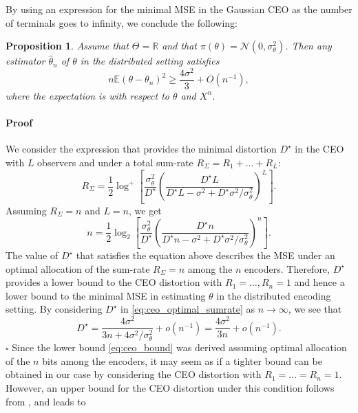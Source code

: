\documentclass[letterpaper, conference,9pt]{IEEEtran}      %
\newtheorem{prop}[thm]{\bf {Proposition}}
\newenvironment{proof}{\paragraph*{Proof}}{\hfill$\square$ \newline}
\begin{document}
By using an expression for the minimal MSE in the Gaussian CEO as the number of terminals goes to infinity, we conclude the following:
\begin{prop} \label{prop:ceo_lower_bound}
Assume that $\Theta = \mathbb R$ and that $\pi(\theta) = \mathcal N(0,\sigma_\theta^2)$. Then any estimator $\widehat{\theta}_n$ of $\theta$ in the distributed setting satisfies
\begin{equation} \label{eq:ceo_bound}
 n\mathbb E \left( \theta - \theta_n \right)^2 \geq \frac{4\sigma^2}{3} + O(n^{-1}),
\end{equation}
where the expectation is with respect to $\theta$ and $X^n$.
\end{prop}

\begin{proof}
We consider the expression \cite[Eq. 10]{chen2004upper} that provides the minimal distortion $D^\star$ in the CEO with $L$ observers and under a total sum-rate $R_\Sigma = R_1 + \ldots +R_L$:
\begin{equation} \label{eq:ceo_optimal_sumrate}
R_{\Sigma} = \frac{1}{2} \log^+ \left[ \frac{\sigma_\theta^2}{D^\star} \left( \frac{D^\star L}{ D^\star L - \sigma^2 + D^\star \sigma^2 / \sigma_\theta^2 }\right)^L  \right].
\end{equation}
Assuming $R_\Sigma = n$ and $L=n$, we get
\begin{equation} \label{eq:ceo_optimal_sumrate}
n = \frac{1}{2} \log_2 \left[ \frac{\sigma_\theta^2}{D^\star} \left(\frac{ D^\star n }{D^\star n - \sigma^2 + D^\star \sigma^2/\sigma_\theta^2 }  \right)^n  \right].
\end{equation}
The value of $D^\star$ that satisfies the equation above describes the MSE under an optimal allocation of the sum-rate $R_\Sigma = n$ among the $n$ encoders. Therefore, $D^\star$ provides a lower bound to the CEO distortion with $R_1=\ldots,R_n = 1$ and hence a lower bound to the minimal MSE in estimating $\theta$ in the distributed encoding setting. By considering $D^\star$ in \eqref{eq:ceo_optimal_sumrate} as $n\rightarrow \infty$, we see that 
\[
D^\star = \frac{ 4\sigma^2 }{3n + 4 \sigma^2 / \sigma_\theta^2 } + o(n^{-1}) =  \frac{4\sigma^2}{3n} + o(n^{-1}). 
\]
\end{proof}
Since the lower bound \eqref{eq:ceo_bound}  was derived assuming optimal allocation of the $n$ bits among the encoders, it may seem as if a tighter bound can be obtained in our case by considering the CEO distortion with $R_1=\ldots = R_n = 1$. However, an upper bound for the CEO distortion under this condition follows from \cite[Prop. 5.2]{KipnisRini2017}, and leads to
\end{document}
